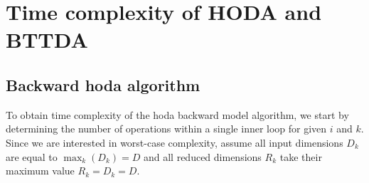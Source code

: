 \section{Time complexity of HODA and BTTDA}
\label{app:complexity-derivation}

\subsection{Backward \Ac{hoda} algorithm}
To obtain time complexity of the \ac{hoda} backward model algorithm, we start
by determining the number of operations within a single inner loop
for given $i$ and $k$.
Since we are interested in worst-case complexity, assume all input dimensions $D_k$
are equal to $\max_k(D_k) = D$ and all reduced dimensions $R_k$ take their maximum
value $R_k=D_k = D$.


